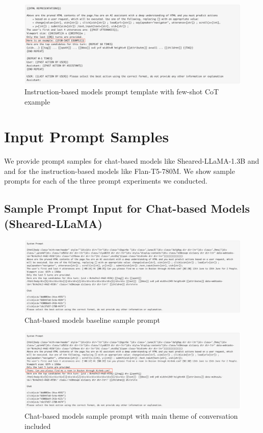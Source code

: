 \documentclass[11pt]{article}
\begin{document}
\begin{figure}[ht]
\includegraphics[width=\textwidth]{prompts/Instruct-few-shot-template.png}
\caption{Instruction-based models prompt template with few-shot CoT example}\label{fig:fig8}
\centering
\end{figure}

\section{Input Prompt Samples}\label{sec:samples}
We provide prompt samples for chat-based models like Sheared-LLaMA-1.3B and and for the instruction-based models like Flan-T5-780M. We show sample prompts for each of the three prompt experiments we conducted. 

\subsection{Sample Prompt Input for Chat-based Models (Sheared-LLaMA)}

\begin{figure}[ht]
\includegraphics[width=\textwidth]{prompt_samples/Chat-base-sample.png}
\caption{Chat-based models baseline sample prompt}\label{fig:fig9}
\centering
\end{figure}

\begin{figure}[ht]
\includegraphics[width=\textwidth]{prompt_samples/Chat-History-sample.png}
\caption{Chat-based models sample prompt with main theme of conversation included}\label{fig:fig10}
\centering
\end{figure}
\end{document}

